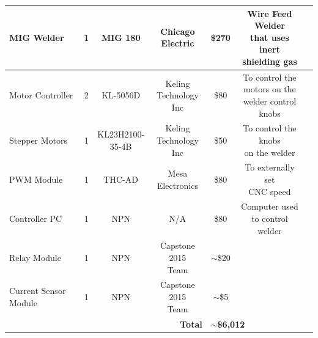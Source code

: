 \documentclass[12pt]{article}
\begin{document}
\begin{adjustwidth}{-2cm}{-2cm}
\begin{center}
\begin{tabular}{ |c|c|c|c|c|c|c| }
 
  \multicolumn{1}{|l|}{MIG Welder} & \multicolumn{1}{c|}{1} & \multicolumn{1}{c|}{MIG 180} & \makecell{Chicago \\ Electric} & \$270 & \makecell{Wire Feed Welder \\ that uses \\ inert shielding gas}   \\ \hline
  \multicolumn{1}{|l|}{Motor Controller} & \multicolumn{1}{c|}{2} & \multicolumn{1}{c|}{KL-5056D} & \makecell{Keling \\ Technology \\ Inc} & \$80 & \makecell{To control the \\ motors on the \\ welder control knobs}
   \\ \hline
  
  \multicolumn{1}{|l|}{Stepper Motors} & 1 & \makecell{KL23H2100-\\35-4B} & \makecell{Keling \\ Technology \\ Inc} & \$50 & \makecell{To control the knobs \\ on the welder}   \\ \hline
  
  \multicolumn{1}{|l|}{PWM Module} & 1 & THC-AD  & \makecell{Mesa \\ Electronics} & \$80 & \makecell{To externally set \\ CNC speed}   \\ \hline
  
  \multicolumn{1}{|l|}{Controller PC} & 1 & NPN  & N/A & \$80 & \makecell{Computer used \\ to control welder}   \\ \hline
  
    
  \multicolumn{1}{|l|}{Relay Module} & 1 & NPN  & \makecell{Capstone 2015 \\ Team} & $\sim$\$20 &    \\ \hline
  
  \multicolumn{1}{|l|}{Current Sensor Module} & 1 & NPN  & \makecell{Capstone 2015 \\ Team} & $\sim$\$5 &    \\ \hline
  
  \multicolumn{4}{|r|}{\textbf{Total}} & \multicolumn{2}{|l|}{\textbf{$\sim$\$6,012}}     \\ \hline
  
  
\end{tabular}
\end{center}




\clearpage

\end{adjustwidth}
\end{document}
